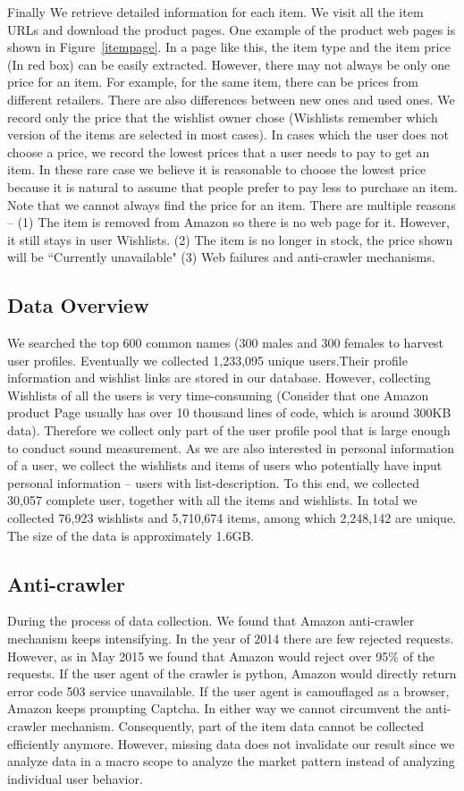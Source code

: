 Finally We retrieve detailed information for each item. We visit all the item URLs and download the product pages. One example of the product web pages is shown in Figure~\ref{itempage}. In a page like this, the item type and the item price (In red box) can be easily extracted. However, there may not always be only one price for an item. For example, for the same item, there can be prices from different retailers. There are also differences between new ones and used ones. We record only the price that the wishlist owner chose (Wishlists remember which version of the items are selected in most cases). In cases which the user does not choose a price, we record the lowest prices that a user needs to pay to get an item. In these rare case we believe it is reasonable to choose the lowest price because it is natural to assume that people prefer to pay less to purchase an item. Note that we cannot always find the price for an item. There are multiple reasons -- (1) The item is removed from Amazon so there is no web page for it. However, it still stays in user Wishlists. (2) The item is no longer in stock, the price shown will be ``Currently unavailable" (3) Web failures and anti-crawler mechanisms.

\subsection{Data Overview}
We searched the top 600 common names (300 males \cite{mnames} and 300 females \cite{fnames} to harvest user profiles. Eventually we collected 1,233,095 unique users.Their profile information and wishlist links are stored in our database. However, collecting Wishlists of all the users is very time-consuming (Consider that one Amazon product Page usually has over 10 thousand lines of code, which is around 300KB data). Therefore we collect only part of the user profile pool that is large enough to conduct sound measurement. As we are also interested in personal information of a user, we collect the wishlists and items of users who potentially have input personal information -- users with list-description. To this end, we collected 30,057 complete user, together with all the items and wishlists. In total we collected 76,923 wishlists and 5,710,674 items, among which 2,248,142 are unique. The size of the data is approximately 1.6GB. 

\subsection{Anti-crawler}
During the process of data collection. We found that Amazon anti-crawler mechanism keeps intensifying. In the year of 2014 there are few rejected requests. However, as in May 2015 we found that Amazon would reject over 95\% of the requests. If the user agent of the crawler is python, Amazon would directly return error code 503 service unavailable. If the user agent is camouflaged as a browser, Amazon keeps prompting Captcha. In either way we cannot circumvent the anti-crawler mechanism. Consequently, part of the item data cannot be collected efficiently anymore. However, missing data does not invalidate our result since we analyze data in a macro scope to analyze the market pattern instead of analyzing individual user behavior. 


